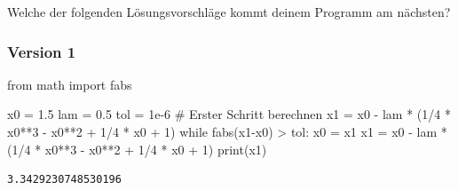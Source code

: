 \documentclass[
  letterpaper,
  DIV=11,
  oneside]{scrreprt}
\newenvironment{Shaded}{\begin{snugshade}}{\end{snugshade}}
\newcommand{\BuiltInTok}[1]{\textcolor[rgb]{0.00,0.23,0.31}{#1}}
\newcommand{\CommentTok}[1]{\textcolor[rgb]{0.37,0.37,0.37}{#1}}
\newcommand{\ControlFlowTok}[1]{\textcolor[rgb]{0.00,0.23,0.31}{#1}}
\newcommand{\DecValTok}[1]{\textcolor[rgb]{0.68,0.00,0.00}{#1}}
\newcommand{\FloatTok}[1]{\textcolor[rgb]{0.68,0.00,0.00}{#1}}
\newcommand{\ImportTok}[1]{\textcolor[rgb]{0.00,0.46,0.62}{#1}}
\newcommand{\NormalTok}[1]{\textcolor[rgb]{0.00,0.23,0.31}{#1}}
\newcommand{\OperatorTok}[1]{\textcolor[rgb]{0.37,0.37,0.37}{#1}}
\theoremstyle{definition}
\theoremstyle{definition}
\theoremstyle{remark}
\begin{document}
\begin{tcolorbox}[enhanced jigsaw, title=\textcolor{quarto-callout-tip-color}{\faLightbulb}\hspace{0.5em}{Lösung}, colbacktitle=quarto-callout-tip-color!10!white, bottomrule=.15mm, titlerule=0mm, colback=white, breakable, colframe=quarto-callout-tip-color-frame, bottomtitle=1mm, toptitle=1mm, leftrule=.75mm, arc=.35mm, left=2mm, rightrule=.15mm, toprule=.15mm, opacitybacktitle=0.6, opacityback=0, coltitle=black]

Welche der folgenden Lösungsvorschläge kommt deinem Programm am
nächsten?

\hypertarget{version-1-1}{%
\subsubsection{Version 1}\label{version-1-1}}

\begin{Shaded}
\begin{Highlighting}[]
\ImportTok{from}\NormalTok{ math }\ImportTok{import}\NormalTok{ fabs}

\NormalTok{x0 }\OperatorTok{=} \FloatTok{1.5}
\NormalTok{lam }\OperatorTok{=} \FloatTok{0.5}
\NormalTok{tol }\OperatorTok{=} \FloatTok{1e{-}6}
\CommentTok{\# Erster Schritt berechnen}
\NormalTok{x1 }\OperatorTok{=}\NormalTok{ x0 }\OperatorTok{{-}}\NormalTok{ lam }\OperatorTok{*}\NormalTok{ (}\DecValTok{1}\OperatorTok{/}\DecValTok{4} \OperatorTok{*}\NormalTok{ x0}\OperatorTok{**}\DecValTok{3} \OperatorTok{{-}}\NormalTok{ x0}\OperatorTok{**}\DecValTok{2} \OperatorTok{+} \DecValTok{1}\OperatorTok{/}\DecValTok{4} \OperatorTok{*}\NormalTok{ x0 }\OperatorTok{+} \DecValTok{1}\NormalTok{)}
\ControlFlowTok{while}\NormalTok{ fabs(x1}\OperatorTok{{-}}\NormalTok{x0) }\OperatorTok{\textgreater{}}\NormalTok{ tol:}
\NormalTok{    x0 }\OperatorTok{=}\NormalTok{ x1}
\NormalTok{    x1 }\OperatorTok{=}\NormalTok{ x0 }\OperatorTok{{-}}\NormalTok{ lam }\OperatorTok{*}\NormalTok{ (}\DecValTok{1}\OperatorTok{/}\DecValTok{4} \OperatorTok{*}\NormalTok{ x0}\OperatorTok{**}\DecValTok{3} \OperatorTok{{-}}\NormalTok{ x0}\OperatorTok{**}\DecValTok{2} \OperatorTok{+} \DecValTok{1}\OperatorTok{/}\DecValTok{4} \OperatorTok{*}\NormalTok{ x0 }\OperatorTok{+} \DecValTok{1}\NormalTok{)}
\BuiltInTok{print}\NormalTok{(x1)}
\end{Highlighting}
\end{Shaded}

\begin{verbatim}
3.3429230748530196
\end{verbatim}


\end{tcolorbox}
\end{document}

